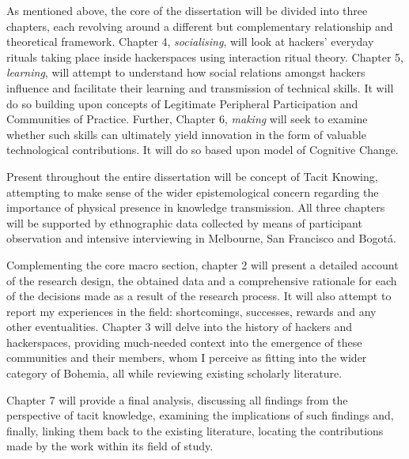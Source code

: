 As mentioned above, the core of the dissertation will be divided into three chapters, each revolving around a different but complementary relationship and theoretical framework. Chapter 4, \textit{socialising}, will look at hackers' everyday rituals taking place inside hackerspaces using  interaction ritual theory. Chapter 5, \textit{learning}, will attempt to understand how social relations amongst hackers influence and facilitate their learning and transmission of technical skills. It will do so building upon  concepts of Legitimate Peripheral Participation and Communities of Practice. Further, Chapter 6, \textit{making} will seek to examine whether such skills can ultimately yield innovation in the form of valuable technological contributions. It will do so based upon  model of Cognitive Change.

Present throughout the entire dissertation will be  concept of Tacit Knowing, attempting to make sense of the wider epistemological concern regarding the importance of physical presence in knowledge transmission. All three chapters will be supported by ethnographic data collected by means of participant observation and intensive interviewing in Melbourne, San Francisco and Bogot\'{a}.

Complementing the core macro section, chapter 2 will present a detailed account of the research design, the obtained data and a comprehensive rationale for each of the decisions made as a result of the research process. It will also attempt to report my experiences in the field: shortcomings, successes, rewards and any other eventualities. Chapter 3 will delve into the history of hackers and hackerspaces, providing much-needed context into the emergence of these communities and their members, whom I perceive as fitting into the wider category of Bohemia, all while reviewing existing scholarly literature.

Chapter 7 will provide a final analysis, discussing all findings from the perspective of tacit knowledge, examining the implications of such findings and, finally, linking them back to the existing literature, locating the contributions made by the work within its field of study.
